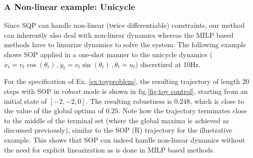 \subsubsection{A Non-linear example: Unicycle}
\label{sec:nl_unicycle}
Since SQP can handle non-linear (twice differentiable) constraints, our method can inherently also deal with non-linear dynamics whereas the MILP based methods have to linearize dynamics to solve the system. The following example shows SOP applied in a one-shot manner to the unicycle dynamics ($\dot{x}_t=v_t \cos (\theta_t)\, ,\dot{y}_t=v_t \sin (\theta_t)\, ,\dot{\theta}_t= u_t$) discretized at 10Hz.


For the specification of Ex. \ref{ex:toyproblem}, the resulting trajectory of length 20 steps with SOP in $\textit{robust}$ mode is shown in fig.\ref{fig:toy control}, starting from an initial state of $[-2,-2,0]$. The resulting robustness is $0.248$, which is close to the value of the global optima of $0.25$. Note how the trajectory terminates close to the middle of the terminal set (where the global maxima is achieved as discussed previously), similar to the SOP (R) trajectory for the illustrative example. This shows that SOP can indeed handle non-linear dynamics without the need for explicit linearization as is done in MILP based methods.
